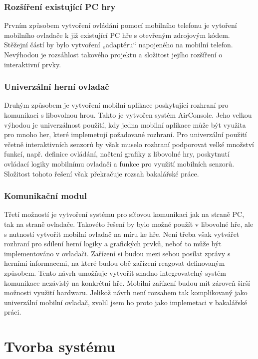 \documentclass[thesis=B,czech,hidelinks]{FITthesis}[2012/06/26] %
\begin{document}
\subsection{Rozšíření existující PC hry}

Prvním způsobem vytvoření ovládání pomocí mobilního telefonu je vytoření mobilního ovladače k již existující PC hře s otevřeným zdrojovým kódem. Stěžejní částí by bylo vytvoření „adaptéru“ napojeného na mobilní telefon. Nevýhodou je rozsáhlost takového projektu a složitost jejího rozšíření o interaktivní prvky.

\subsection{Univerzální herní ovladač}

Druhým způsobem je vytvoření mobilní aplikace poskytující rozhraní pro komunikaci s libovolnou hrou. Takto je vytvořen systém AirConsole. Jeho velkou výhodou je univerzálnost použítí, kdy jedna mobilní aplikace může být využita pro mnoho her, které implemetují požadované rozhraní. Pro univerzální použití včetně interaktivních senzorů by však muselo rozhraní podporovat velké množství funkcí, např. definice ovládání, načtení grafiky z libovolné hry, poskytnutí ovládací logiky mobilnímu ovladači a funkce pro využití mobilních senzorů. Složitost tohoto řešení však překračuje rozsah bakalářské práce.

\subsection{Komunikační modul}

Třetí možností je vytvoření systému pro síťovou komunikaci jak na straně PC, tak na straně ovladače. Takovéto řešení by bylo možné použít v libovolné hře, ale s nutností vytvořit mobilní ovladač na míru ke hře. Není třeba však vytvářet rozhraní pro sdílení herní logiky a grafických prvků, neboť to může být implementováno v ovladači. Zařízení si budou mezi sebou posílat zprávy s herními informacemi, na které budou obě zařízení reagovat definovaným způsobem. Tento návrh umožňuje vytvořit snadno integrovatelný systém komunikace nezávislý na konkrétní hře. Mobilní zařízení budou mít zároveň širší možnosti využití hardwaru. Jelikož návrh není rozsahem tak komplikovaný jako univerzální mobilní ovladač, zvolil jsem ho proto jako implemetaci v bakalářské práci.

\chapter{Tvorba systému}
\label{chapter:implementation}
\end{document}

